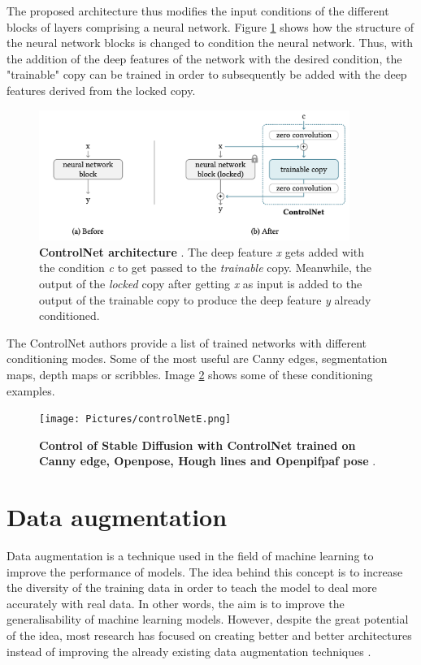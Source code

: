 The proposed architecture thus modifies the input conditions of the different blocks of layers comprising a neural network. Figure \ref{fig:controlNetD} shows how the structure of the neural network blocks is changed to condition the neural network. Thus, with the addition of the deep features of the network with the desired condition, the "trainable" copy can be trained in order to subsequently be added with the deep features derived from the locked copy. 

\begin{figure}
    \centering
    \includegraphics[width=0.9\textwidth]{Pictures/controlNetD.png} 
    \caption{\textbf{ControlNet architecture} \cite{zhang2023adding}. The deep feature \textit{x} gets added with the condition \textit{c} to get passed to the \textit{trainable} copy. Meanwhile, the output of the \textit{locked} copy after getting \textit{x} as input is added to the output of the trainable copy to produce the deep feature \textit{y} already conditioned.}
    \label{fig:controlNetD}
\end{figure}

The ControlNet authors provide a list of trained networks with different conditioning modes. Some of the most useful are Canny edges, segmentation maps, depth maps or scribbles. Image \ref{fig:controlNetE} shows some of these conditioning examples.

\begin{figure}
    \centering
    \texttt{[image: Pictures/controlNetE.png]} 
    \caption{\textbf{Control of Stable Diffusion with ControlNet trained on Canny edge, Openpose, Hough lines and Openpifpaf pose} \cite{zhang2023adding}.}
    \label{fig:controlNetE}
\end{figure}

\section{Data augmentation}

Data augmentation is a technique used in the field of machine learning to improve the performance of models. The idea behind this concept is to increase the diversity of the training data in order to teach the model to deal more accurately with real data. In other words, the aim is to improve the generalisability of machine learning models. However, despite the great potential of the idea, most research has focused on creating better and better architectures instead of improving the already existing data augmentation techniques \cite{cubuk2018autoaugment}.

